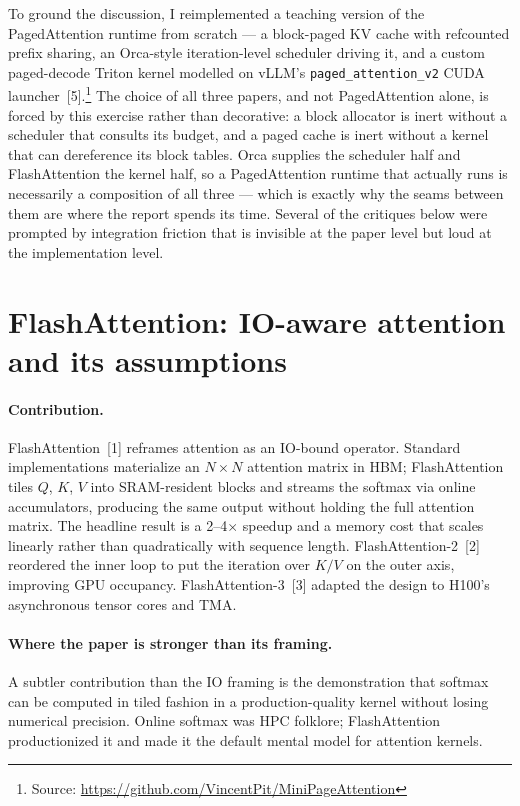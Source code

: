 \documentclass{article}
\begin{document}
To ground the discussion, I reimplemented a teaching version of the PagedAttention runtime from scratch --- a block-paged KV cache with refcounted prefix sharing, an Orca-style iteration-level scheduler driving it, and a custom paged-decode Triton kernel modelled on vLLM's \texttt{paged\_attention\_v2} CUDA launcher~[5].\footnote{Source: \url{https://github.com/VincentPit/MiniPageAttention}} The choice of all three papers, and not PagedAttention alone, is forced by this exercise rather than decorative: a block allocator is inert without a scheduler that consults its budget, and a paged cache is inert without a kernel that can dereference its block tables. Orca supplies the scheduler half and FlashAttention the kernel half, so a PagedAttention runtime that actually runs is necessarily a composition of all three --- which is exactly why the seams between them are where the report spends its time. Several of the critiques below were prompted by integration friction that is invisible at the paper level but loud at the implementation level.

\section{FlashAttention: IO-aware attention and its assumptions}

\paragraph{Contribution.} FlashAttention~[1] reframes attention as an IO-bound operator. Standard implementations materialize an $N \times N$ attention matrix in HBM; FlashAttention tiles $Q$, $K$, $V$ into SRAM-resident blocks and streams the softmax via online accumulators, producing the same output without holding the full attention matrix. The headline result is a 2--4$\times$ speedup and a memory cost that scales linearly rather than quadratically with sequence length. FlashAttention-2~[2] reordered the inner loop to put the iteration over $K/V$ on the outer axis, improving GPU occupancy. FlashAttention-3~[3] adapted the design to H100's asynchronous tensor cores and TMA.

\paragraph{Where the paper is stronger than its framing.} A subtler contribution than the IO framing is the demonstration that softmax can be computed in tiled fashion in a production-quality kernel without losing numerical precision. Online softmax was HPC folklore; FlashAttention productionized it and made it the default mental model for attention kernels.
\end{document}
